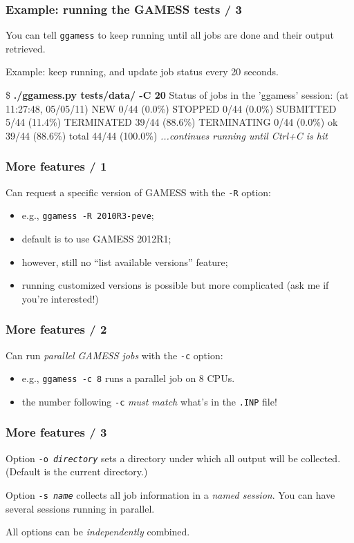 \documentclass[english,serif,mathserif,xcolor=pdftex,dvipsnames,table]{beamer}
\begin{document}
\begin{frame}[fragile]
  \frametitle{Example: running the GAMESS tests / 3}

  You can tell \texttt{ggamess} to keep running until all jobs are
  done and their output retrieved.

  \+
  Example: keep running, and update job status every 20 seconds.
  \begin{scriptsize}
  \begin{semiverbatim}
\$ \textbf{./ggamess.py tests/data/ -C 20}
Status of jobs in the 'ggamess' session: (at 11:27:48, 05/05/11)
        NEW   0/44     (0.0\%)  
    STOPPED   0/44     (0.0\%)  
  SUBMITTED   5/44    (11.4\%)  
 TERMINATED   39/44   (88.6\%)  
TERMINATING   0/44     (0.0\%)  
         ok   39/44   (88.6\%)  
      total   44/44   (100.0\%) 
\emph{...continues running until Ctrl+C is hit}
\end{semiverbatim}
  \end{scriptsize}
\end{frame}


\begin{frame}[fragile]
  \frametitle{More features / 1}

  Can request a specific version of GAMESS with the \texttt{-R}
  option:
    \begin{itemize}
    \item e.g., \texttt{ggamess -R 2010R3-peve};
    \item default is to use GAMESS 2012R1;
    \item however, still no ``list available versions'' feature;
    \item running customized versions is possible but more complicated
      (ask me if you're interested!)
    \end{itemize}
\end{frame}


\begin{frame}[fragile]
  \frametitle{More features / 2}

  Can run \emph{parallel GAMESS jobs} with the \texttt{-c} option:
  \begin{itemize}
  \item e.g., \texttt{ggamess -c 8} runs a parallel job on 8 CPUs.
  \item the number following \texttt{-c} \emph{must match} what's in
    the \texttt{.INP} file!
  \end{itemize}
\end{frame}


\begin{frame}[fragile]
  \frametitle{More features / 3}

  Option \texttt{-o \emph{directory}} sets a directory under which all
  output will be collected. (Default is the current directory.)

  \+ 
  Option \texttt{-s \emph{name}} collects all job information in a
  \emph{named session}.  You can have several sessions running in
  parallel.
  
  \+ 
  All options can be \emph{independently} combined.
\end{frame}
\end{document}
